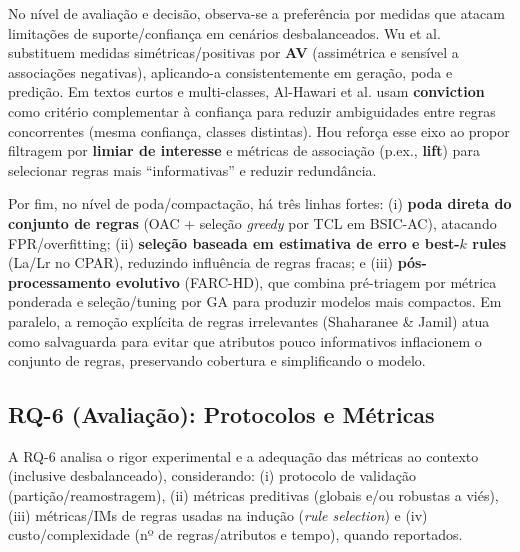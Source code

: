 No nível de avaliação e decisão, observa-se a preferência por medidas que atacam limitações de suporte/confiança em cenários desbalanceados. Wu et al. substituem medidas simétricas/positivas por \textbf{AV} (assimétrica e sensível a associações negativas), aplicando-a consistentemente em geração, poda e predição. Em textos curtos e multi-classes, Al-Hawari et al. usam \textbf{conviction} como critério complementar à confiança para reduzir ambiguidades entre regras concorrentes (mesma confiança, classes distintas). Hou reforça esse eixo ao propor filtragem por \textbf{limiar de interesse} e métricas de associação (p.ex., \textbf{lift}) para selecionar regras mais “informativas” e reduzir redundância.

Por fim, no nível de poda/compactação, há três linhas fortes: (i) \textbf{poda direta do conjunto de regras} (OAC + seleção \textit{greedy} por TCL em BSIC-AC), atacando FPR/overfitting; (ii) \textbf{seleção baseada em estimativa de erro e best-$k$ rules} (La/Lr no CPAR), reduzindo influência de regras fracas; e (iii) \textbf{pós-processamento evolutivo} (FARC-HD), que combina pré-triagem por métrica ponderada e seleção/tuning por GA para produzir modelos mais compactos. Em paralelo, a remoção explícita de regras irrelevantes (Shaharanee \& Jamil) atua como salvaguarda para evitar que atributos pouco informativos inflacionem o conjunto de regras, preservando cobertura e simplificando o modelo.

\subsection{RQ-6 (Avaliação): Protocolos e Métricas}

A RQ-6 analisa o rigor experimental e a adequação das métricas ao contexto (inclusive desbalanceado),
considerando: (i) protocolo de validação (partição/reamostragem), (ii) métricas preditivas (globais e/ou
robustas a viés), (iii) métricas/IMs de regras usadas na indução (\textit{rule selection}) e (iv) custo/complexidade
(nº de regras/atributos e tempo), quando reportados.

